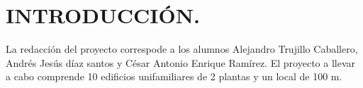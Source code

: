 \section*{INTRODUCCIÓN.}

La redacción del proyecto correspode a los alumnos Alejandro Trujillo Caballero, Andrés Jesús díaz santos y César Antonio Enrique Ramírez. El proyecto a llevar a cabo comprende 10 edificios unifamiliares de 2 plantas y un local de 100 m. 